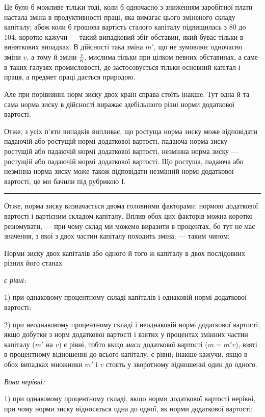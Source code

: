 Це було б можливе тільки тоді, коли б одночасно з зниженням
заробітної плати настала зміна в продуктивності праці, яка
вимагає цього зміненого складу капіталу; абож коли б грошова вартість
сталого капіталу підвищилась з 80 до 104; коротко кажучи —
такий випадковий збіг обставин, який буває тільки в виняткових
випадках. В дійсності така зміна $m'$, що не зумовлює одночасно
зміни $v$, а тому й зміни $\frac{v}{K}$, мислима тільки при цілком певних
обставинах, а саме в таких галузях промисловості, де застосовується
тільки основний капітал і праця, а предмет праці дається
природою.

Але при порівнянні норм зиску двох країн справа стоїть
інакше. Тут одна й та сама норма зиску в дійсності виражає
здебільшого різні норми додаткової вартості.

Отже, з усіх п’яти випадків випливає, що ростуща норма
зиску може відповідати падаючій або ростущій нормі додаткової
вартості, падаюча норма зиску — ростущій або падаючій
нормі додаткової вартості, незмінна норма зиску — ростущій або
падаючій нормі додаткової вартості. Що ростуща, падаюча або
незмінна норма зиску може також відповідати незмінній нормі
додаткової вартості, це ми бачили під рубрикою І.

\pfbreak

Отже, норма зиску визначається двома головними факторами:
нормою додаткової вартості і вартісним складом капіталу.
Вплив обох цих факторів можна коротко резюмувати, — при чому
склад ми можемо виразити в процентах, бо тут не має значення,
з якої з двох частин капіталу походить зміна, — таким чином:

Норми зиску двох капіталів або одного й того ж капіталу
в двох послідовних різних його станах

\emph{є рівні:}

1) при однаковому процентному складі капіталів і однаковій
нормі додаткової вартості;

2) при неоднаковому процентному складі і неоднаковій нормі
додаткової вартості, якщо добутки з норм додаткової вартості
і взятих у процентах змінних частин капіталу ($m'$ на $v$) є рівні,
тобто якщо \emph{маси} додаткової вартості ($m = m'v$), взяті в процентному
відношенні до всього капіталу, є рівні; інакше кажучи,
якщо в обох випадках множники $m'$ і $v$ стоять у зворотному
відношенні один до одного.

\emph{Вони нерівні:}

1) при однаковому процентному складі, якщо норми додаткової
вартості нерівні, при чому норми зиску відносяться одна до
одної, як норми додаткової вартості;
\parbreak{}  %
